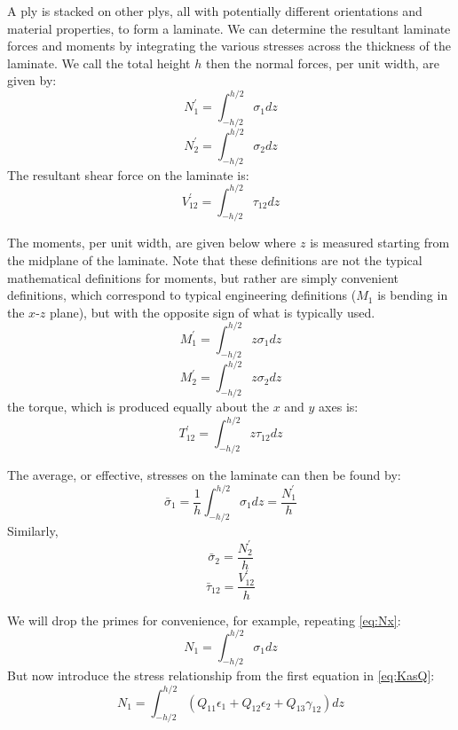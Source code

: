 \documentclass{article}
\begin{document}
A ply is stacked on other plys, all with potentially different orientations and material properties, to form a laminate.  We can determine the resultant laminate forces and moments by integrating the various stresses across the thickness of the laminate.  We call the total height $h$ then the normal forces, per unit width, are given by:
\begin{equation}
N_1^\prime = \int_{-h/2}^{h/2} \sigma_1 dz
\label{eq:Nx}
\end{equation}
\begin{equation}
N_2^\prime = \int_{-h/2}^{h/2} \sigma_2 dz
\end{equation}
The resultant shear force on the laminate is:
\begin{equation}
V_{12}^\prime = \int_{-h/2}^{h/2} \tau_{12} dz
\end{equation}

The moments, per unit width, are given below where $z$ is measured starting from the midplane of the laminate.  Note that these definitions are not the typical mathematical definitions for moments, but rather are simply convenient definitions, which correspond to typical engineering definitions ($M_1$ is bending in the $x$-$z$ plane), but with the opposite sign of what is typically used.
\begin{equation}
M_1^\prime = \int_{-h/2}^{h/2} z \sigma_1 dz
\label{eq:M1}
\end{equation}
\begin{equation}
M_2^\prime = \int_{-h/2}^{h/2} z \sigma_2 dz
\end{equation}
the torque, which is produced equally about the $x$ and $y$ axes is:
\begin{equation}
T_{12}^\prime = \int_{-h/2}^{h/2} z \tau_{12} dz
\end{equation}

The average, or effective, stresses on the laminate can then be found by:
\begin{equation}
\bar\sigma_1 = \frac{1}{h} \int_{-h/2}^{h/2} \sigma_1 dz = \frac{N_1^\prime}{h}
\label{eq:effectivestress}
\end{equation}
Similarly,
\begin{equation}
\bar\sigma_2 = \frac{N_2^\prime}{h}
\end{equation}
\begin{equation}
\bar\tau_{12} = \frac{V_{12}^\prime}{h}
\end{equation}

We will  drop the primes for convenience, for example, repeating \cref{eq:Nx}:
\begin{equation}
N_1 = \int_{-h/2}^{h/2} \sigma_1 dz
\end{equation}
But now introduce the stress relationship from the first equation in \cref{eq:KasQ}:
\begin{equation}
N_1 = \int_{-h/2}^{h/2} (Q_{11} \epsilon_1 + Q_{12} \epsilon_2 + Q_{13} \gamma_{12}) dz
\end{equation}
\end{document}
